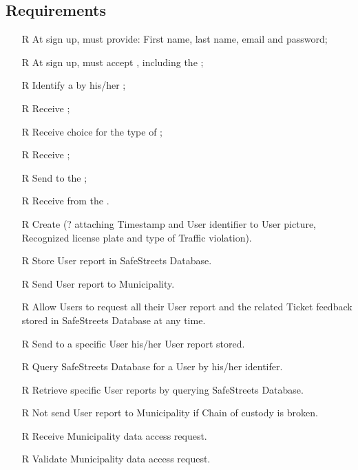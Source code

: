 \documentclass[../../../rasd.tex]{subfiles}
\begin{document}
\subsection{Requirements\label{sect:3.2.5}}
\begin{itemize}
	
	
	\item[R\subs{1}]At sign up,  must provide: First name, last name, email and password;
	\item[R\subs{2}]At sign up,  must accept , including the ;
	\item[R\subs{3}]Identify a  by his/her ;
	\item[R\subs{4}]Receive ;
	\item[R\subs{5}]Receive  choice for the type of ;
	\item[R\subs{6}]Receive ;
	\item[R\subs{7}]Send  to the ;
	\item[R\subs{8}]Receive  from the .
	\item[R\subs{9}]Create  (? attaching Timestamp and User identifier to User picture, Recognized license plate and type of Traffic violation).
	\item[R\subs{10}]Store User report in SafeStreets Database.
	\item[R\subs{11}]Send User report to Municipality.
	\item[R\subs{}]Allow Users to request all their User report and the related Ticket feedback stored in SafeStreets Database at any time.
	\item[R\subs{}]Send to a specific User his/her User report stored.
	\item[R\subs{}]Query SafeStreets Database for a User by his/her identifer.
	\item[R\subs{}]Retrieve specific User reports by querying SafeStreets Database.
	\item[R\subs{}]Not send User report to Municipality if Chain of custody is broken.
	\item[R\subs{}]Receive Municipality data access request.
	\item[R\subs{}]Validate Municipality data access request.

\end{itemize}
\end{document}
